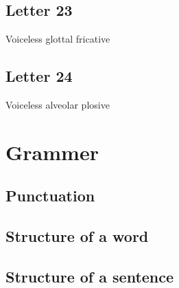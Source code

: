 \documentclass{book}
\newcommand{\letter}[1]{\begin{center}\resizebox{1cm}{!}{\texttt{[image: \#1]}}\end{center}}
\begin{document}
\section{Letter 23}
Voiceless glottal fricative

\letter{letters/consonants/23.JPG}


\section{Letter 24}
Voiceless alveolar plosive

\letter{letters/consonants/24.JPG}



\chapter{Grammer}
\section{Punctuation}


\section{Structure of a word}


\section{Structure of a sentence}
\end{document}
